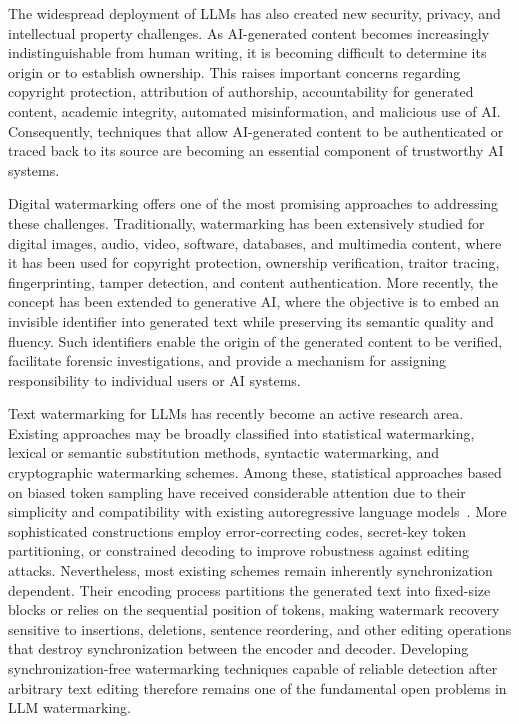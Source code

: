 \documentclass[a4paper,11pt]{llncs}
\begin{document}
The widespread deployment of LLMs has also created new security, privacy, and intellectual property challenges. As AI-generated content becomes increasingly indistinguishable from human writing, it is becoming difficult to determine its origin or to establish ownership. This raises important concerns regarding copyright protection, attribution of authorship, accountability for generated content, academic integrity, automated misinformation, and malicious use of AI. Consequently, techniques that allow AI-generated content to be authenticated or traced back to its source are becoming an essential component of trustworthy AI systems.

Digital watermarking offers one of the most promising approaches to addressing these challenges. Traditionally, watermarking has been extensively studied for digital images, audio, video, software, databases, and multimedia content, where it has been used for copyright protection, ownership verification, traitor tracing, fingerprinting, tamper detection, and content authentication. More recently, the concept has been extended to generative AI, where the objective is to embed an invisible identifier into generated text while preserving its semantic quality and fluency. Such identifiers enable the origin of the generated content to be verified, facilitate forensic investigations, and provide a mechanism for assigning responsibility to individual users or AI systems.

Text watermarking for LLMs has recently become an active research area. Existing approaches may be broadly classified into statistical watermarking, lexical or semantic substitution methods, syntactic watermarking, and cryptographic watermarking schemes. Among these, statistical approaches based on biased token sampling have received considerable attention due to their simplicity and compatibility with existing autoregressive language models~\cite{kirchenbauer2023watermark}. More sophisticated constructions employ error-correcting codes, secret-key token partitioning, or constrained decoding to improve robustness against editing attacks. Nevertheless, most existing schemes remain inherently synchronization dependent. Their encoding process partitions the generated text into fixed-size blocks or relies on the sequential position of tokens, making watermark recovery sensitive to insertions, deletions, sentence reordering, and other editing operations that destroy synchronization between the encoder and decoder. Developing synchronization-free watermarking techniques capable of reliable detection after arbitrary text editing therefore remains one of the fundamental open problems in LLM watermarking.
\end{document}
